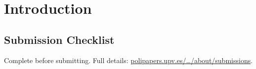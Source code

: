 \documentclass{wpom-upv}
\begin{document}
\section{Introduction}


\subsection{Submission Checklist}

Complete before submitting.
Full details: \href{https://polipapers.upv.es/index.php/WPOM/about/submissions}{polipapers.upv.es/…/about/submissions}.
\end{document}
